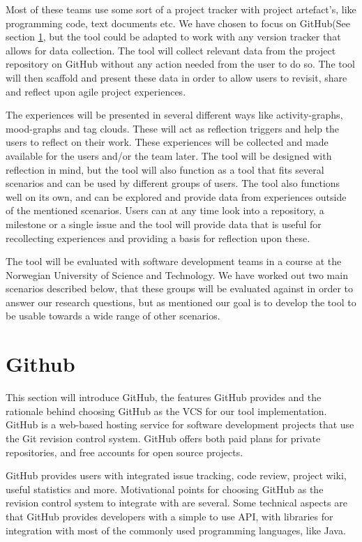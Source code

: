 Most of these teams use some sort of a project tracker with project artefact's, like programming code, text documents etc. We have chosen to focus on GitHub(See section \ref{githubchapter}, but the tool could be adapted to work with any version tracker that allows for data collection. The tool will collect relevant data from the project repository on GitHub without any action needed from the user to do so. The tool will then scaffold and present these data in order to allow users to revisit, share and reflect upon agile project experiences.

The experiences will be presented in several different ways like activity-graphs, mood-graphs and tag clouds. These will act as reflection triggers and help the users to reflect on their work. These experiences will be collected and made available for the users and/or the team later. The tool will be designed with reflection in mind, but the tool will also function as a tool that fits several scenarios and can be used by different groups of users. The tool also functions well on its own, and can be explored and provide data from experiences outside of the mentioned scenarios. Users can at any time look into a repository, a milestone or a single issue and the tool will provide data that is useful for recollecting experiences and providing a basis for reflection upon these. 

The tool will be evaluated with software development teams in a course at the Norwegian University of Science and Technology. We have worked out two main scenarios described below, that these groups will be evaluated against in order to answer our research questions, but as mentioned our goal is to develop the tool to be usable towards a wide range of other scenarios. 

\section{Github}
\label{githubchapter}
This section will introduce GitHub, the features GitHub provides and the rationale behind choosing GitHub as the VCS for our tool implementation. 
GitHub is a web-based hosting service for software development projects that use the Git revision control system\cite{git,github}. GitHub offers both paid plans for private repositories, and free accounts for open source projects.

GitHub provides users with integrated issue tracking, code review, project wiki, useful statistics and more. 
Motivational points for choosing GitHub as the revision control system to integrate with are several. Some technical aspects are that GitHub provides developers with a simple to use API\cite{githubapi}, with libraries for integration with most of the commonly used programming languages, like Java\cite{jgit}.

